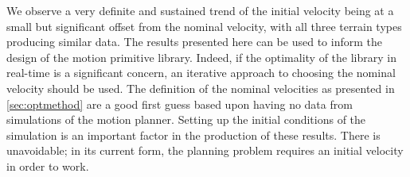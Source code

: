 We observe a very definite and sustained trend of the initial velocity being at a small but significant offset from the nominal velocity, with all three terrain types producing similar data. The results presented here can be used to inform the design of the motion primitive library. Indeed, if the optimality of the library in real-time is a significant concern, an iterative approach to choosing the nominal velocity should be used. The definition of the nominal velocities as presented in \ref{sec:optmethod} are a good first guess based upon having no data from simulations of the motion planner. Setting up the initial conditions of the simulation is an important factor in the production of these results. There is unavoidable; in its current form, the planning problem requires an initial velocity in order to work.